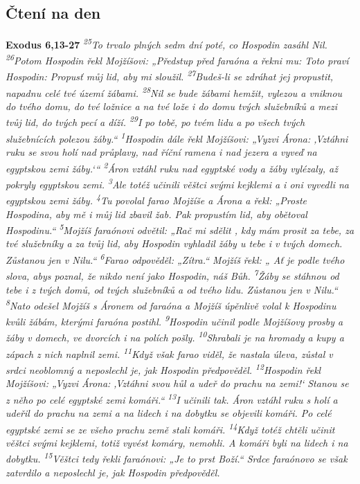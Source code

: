 \documentclass[11pt]{article}
\begin{document}
\subsection*{Čtení na den}
\textbf{Exodus 6,13-27}
\newline
\textit{ 
\textsuperscript{25}To trvalo plných sedm dní poté, co Hospodin zasáhl Nil.
\textsuperscript{26}Potom Hospodin řekl Mojžíšovi: „Předstup před faraóna a řekni mu: Toto praví Hospodin: Propusť můj lid, aby mi sloužil.
\textsuperscript{27}Budeš-li se zdráhat jej propustit, napadnu celé tvé území žábami.
\textsuperscript{28}Nil se bude žábami hemžit, vylezou a vniknou do tvého domu, do tvé ložnice a na tvé lože i do domu tvých služebníků a mezi tvůj lid, do tvých pecí a díží.
\textsuperscript{29}I po tobě, po tvém lidu a po všech tvých služebnících polezou žáby.“
\textsuperscript{1}Hospodin dále řekl Mojžíšovi: „Vyzvi Árona: ‚Vztáhni ruku se svou holí nad průplavy, nad říční ramena i nad jezera a vyveď na egyptskou zemi žáby.‘“
\textsuperscript{2}Áron vztáhl ruku nad egyptské vody a žáby vylézaly, až pokryly egyptskou zemi.
\textsuperscript{3}Ale totéž učinili věštci svými kejklemi a i oni vyvedli na egyptskou zemi žáby.
\textsuperscript{4}Tu povolal farao Mojžíše a Árona a řekl: „Proste Hospodina, aby mě i můj lid zbavil žab. Pak propustím lid, aby obětoval Hospodinu.“
\textsuperscript{5}Mojžíš faraónovi odvětil: „Rač mi sdělit , kdy mám prosit za tebe, za tvé služebníky a za tvůj lid, aby Hospodin vyhladil žáby u tebe i v tvých domech. Zůstanou jen v Nilu.“
\textsuperscript{6}Farao odpověděl: „Zítra.“ Mojžíš řekl: „ Ať je podle tvého slova, abys poznal, že nikdo není jako Hospodin, náš Bůh.
\textsuperscript{7}Žáby se stáhnou od tebe i z tvých domů, od tvých služebníků a od tvého lidu. Zůstanou jen v Nilu.“
\textsuperscript{8}Nato odešel Mojžíš s Áronem od faraóna a Mojžíš úpěnlivě volal k Hospodinu kvůli žábám, kterými faraóna postihl.
\textsuperscript{9}Hospodin učinil podle Mojžíšovy prosby a žáby v domech, ve dvorcích i na polích pošly.
\textsuperscript{10}Shrabali je na hromady a kupy a zápach z nich naplnil zemi.
\textsuperscript{11}Když však farao viděl, že nastala úleva, zůstal v srdci neoblomný a neposlechl je, jak Hospodin předpověděl.
\textsuperscript{12}Hospodin řekl Mojžíšovi: „Vyzvi Árona: ‚Vztáhni svou hůl a udeř do prachu na zemi!‘ Stanou se z něho po celé egyptské zemi komáři.“
\textsuperscript{13}I učinili tak. Áron vztáhl ruku s holí a udeřil do prachu na zemi a na lidech i na dobytku se objevili komáři. Po celé egyptské zemi se ze všeho prachu země stali komáři.
\textsuperscript{14}Když totéž chtěli učinit věštci svými kejklemi, totiž vyvést komáry, nemohli. A komáři byli na lidech i na dobytku.
\textsuperscript{15}Věštci tedy řekli faraónovi: „Je to prst Boží.“ Srdce faraónovo se však zatvrdilo a neposlechl je, jak Hospodin předpověděl.
}
\end{document}

